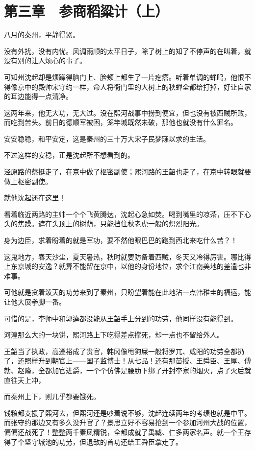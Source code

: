\section{第三章　参商稻粱计（上）}

八月的秦州，平静得紧。

没有外扰，没有内忧。风调雨顺的太平日子，除了树上的知了不停声的在叫着，就没有别的让人烦心的事了。

可知州沈起却是烦躁得脑门上、脸颊上都生了一片疙瘩。听着单调的蝉鸣，他恨不得像京中的殿帅宋守约一样，命人将衙门里的大树上的秋蝉全都给打掉，好让自家的耳边能得一点清净。

这两年来，他无大功，无大过。没在熙河战事中捞到便宜，但也没有被西贼所败，而吃到苦头。前日的德顺军被困，笼竿城既然未破，那他也就没有什么罪名。

安安稳稳，和平安定，这是秦州的三十万大宋子民梦寐以求的生活。

不过这样的安稳，正是沈起所不想看到的。

泾原路的蔡挺走了，在京中做了枢密副使；熙河路的王韶也走了，在京中转眼就要做上枢密副使。

就他沈起还在这里！

看着临近两路的主帅一个个飞黄腾达，沈起心急如焚。喝到嘴里的凉茶，压不下心头的焦躁。遮在头顶上的树荫，只能挡住秋老虎一般的炽烈阳光。

身为边臣，求着盼着的就是军功，要不然他眼巴巴的跑到西北来吃什么苦？！

这鬼地方，春天沙尘，夏天暑热，秋时就要防备着西贼，冬天又冷得厉害。哪比得上东京城的安逸？就算不能留在京中，以他的身份地位，求个江南美地的差遣也非难事。

可他就是贪着泼天的功劳来到了秦州，只盼望着能在此地沾一点韩稚圭的福运，能让他大展拳脚一番。

可惜的是，李师中和郭逵都没能从王韶手上分到的功劳，他同样没有能得到。

河湟那么大的一块饼，熙河路上下吃得差点撑死，却一点也不留给外人。

王韶当了执政，高遵裕成了贵官，韩冈像甩狗屎一般将罗兀、咸阳的功劳全都扔了，还照样升到朝官上——国子监博士！从七品！还有那苗授、王舜臣、王厚、傅勍、赵隆，全都加官进爵，一个个仿佛是腰肋下绑了开封李家的烟火，点了火后就直往天上冲，

而秦州上下，则几乎都要饿死。

钱粮都支援了熙河去，但熙河还是吵着说不够，沈起连续两年的考绩也就是中平。而张守约那边又有多久没升官了？景思立好不容易抢到一个参加河州大战的位置，偏偏还战死了！整整两千秦凤精锐，全都成就了禹臧、仁多两家名声。就一个王存得了个坚守城池的功劳，但退敌的首功还给王舜臣拿走了。

